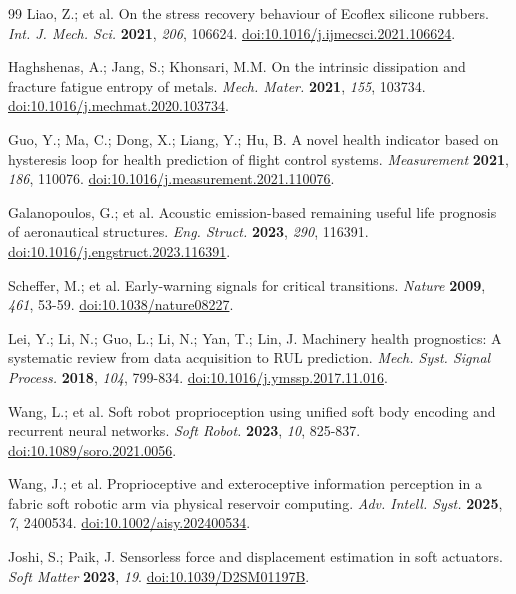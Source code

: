 \documentclass[preprints,article,submit,oneauthor]{Definitions/mdpi}
\begin{document}
\begin{thebibliography}{99}
Liao, Z.; et al. On the stress recovery behaviour of Ecoflex silicone rubbers. \emph{Int. J. Mech. Sci.} \textbf{2021}, \emph{206}, 106624. \href{https://doi.org/10.1016/j.ijmecsci.2021.106624}{doi:10.1016/j.ijmecsci.2021.106624}.

Haghshenas, A.; Jang, S.; Khonsari, M.M. On the intrinsic dissipation and fracture fatigue entropy of metals. \emph{Mech. Mater.} \textbf{2021}, \emph{155}, 103734. \href{https://doi.org/10.1016/j.mechmat.2020.103734}{doi:10.1016/j.mechmat.2020.103734}.

Guo, Y.; Ma, C.; Dong, X.; Liang, Y.; Hu, B. A novel health indicator based on hysteresis loop for health prediction of flight control systems. \emph{Measurement} \textbf{2021}, \emph{186}, 110076. \href{https://doi.org/10.1016/j.measurement.2021.110076}{doi:10.1016/j.measurement.2021.110076}.

Galanopoulos, G.; et al. Acoustic emission-based remaining useful life prognosis of aeronautical structures. \emph{Eng. Struct.} \textbf{2023}, \emph{290}, 116391. \href{https://doi.org/10.1016/j.engstruct.2023.116391}{doi:10.1016/j.engstruct.2023.116391}.

Scheffer, M.; et al. Early-warning signals for critical transitions. \emph{Nature} \textbf{2009}, \emph{461}, 53-59. \href{https://doi.org/10.1038/nature08227}{doi:10.1038/nature08227}.

Lei, Y.; Li, N.; Guo, L.; Li, N.; Yan, T.; Lin, J. Machinery health prognostics: A systematic review from data acquisition to RUL prediction. \emph{Mech. Syst. Signal Process.} \textbf{2018}, \emph{104}, 799-834. \href{https://doi.org/10.1016/j.ymssp.2017.11.016}{doi:10.1016/j.ymssp.2017.11.016}.

Wang, L.; et al. Soft robot proprioception using unified soft body encoding and recurrent neural networks. \emph{Soft Robot.} \textbf{2023}, \emph{10}, 825-837. \href{https://doi.org/10.1089/soro.2021.0056}{doi:10.1089/soro.2021.0056}.

Wang, J.; et al. Proprioceptive and exteroceptive information perception in a fabric soft robotic arm via physical reservoir computing. \emph{Adv. Intell. Syst.} \textbf{2025}, \emph{7}, 2400534. \href{https://doi.org/10.1002/aisy.202400534}{doi:10.1002/aisy.202400534}.

Joshi, S.; Paik, J. Sensorless force and displacement estimation in soft actuators. \emph{Soft Matter} \textbf{2023}, \emph{19}. \href{https://doi.org/10.1039/D2SM01197B}{doi:10.1039/D2SM01197B}.


\end{thebibliography}
\end{document}
